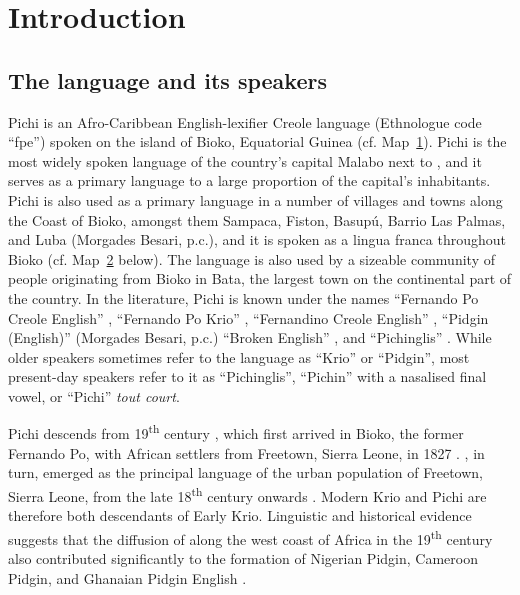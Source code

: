\chapter{Introduction}
\section{The language and its speakers}\label{sec:1.1}

Pichi is an Afro-Caribbean English-lexifier Creole language (Ethnologue code “fpe”) spoken on the island of Bioko, Equatorial Guinea (cf. Map~\hyperref[map:1:1.1]{1}). Pichi is the most widely spoken language of the country’s capital Malabo next to , and it serves as a primary language to a large proportion of the capital’s inhabitants. Pichi is also used as a primary language in a number of villages and towns along the Coast of Bioko, amongst them Sampaca, Fiston, Basupú, Barrio Las Palmas, and Luba (Morgades Besari, p.c.), and it is spoken as a lingua franca throughout Bioko (cf. Map~\hyperref[map:1:1.2]{2} below). The language is also used by a sizeable community of people originating from Bioko in Bata, the largest town on the continental part of the country. In the literature, Pichi is known under the names “Fernando Po Creole English” \citep{SimonsFennig2017}, “Fernando Po Krio” \citep{Berry1970},  “Fernandino Creole English” \citep{Holm1988}, “Pidgin (English)” (Morgades Besari, p.c.) “Broken English” \citep{Zarco1938}, and “Pichinglis” \citep{Lipski1992}. While older speakers sometimes refer to the language as “Krio” or “Pidgin”, most present-day speakers refer to it as “Pichinglis”, “Pichin” with a nasalised final vowel, or “Pichi” \textit{tout court}. 

Pichi descends from 19\textsuperscript{th} century , which first arrived in Bioko, the former Fernando Po, with African settlers from Freetown, Sierra Leone, in 1827 \citep[165]{Fyfe1962}. , in turn, emerged as the principal language of the urban population of Freetown, Sierra Leone, from the late 18\textsuperscript{th} century onwards \citep{Huber1999}. Modern Krio and Pichi are therefore both descendants of Early Krio. Linguistic and historical evidence suggests that the diffusion of  along the west coast of Africa in the 19\textsuperscript{th} century also contributed significantly to the formation of Nigerian Pidgin, Cameroon Pidgin, and Ghanaian Pidgin English \citep{Huber1999}. 

